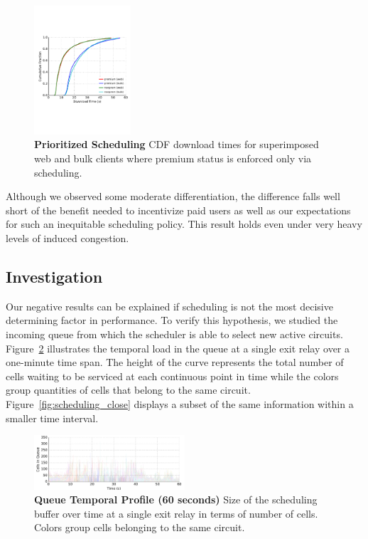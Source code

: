 \begin{figure} \centering
  \includegraphics[trim={0 3cm 0 3cm}, clip, width=0.32\textwidth]{images/scheduling_priority.pdf}
  \caption[Prioritized Scheduling]{\textbf{Prioritized Scheduling} CDF download
    times for superimposed web and bulk clients where premium status is enforced
    only via scheduling.}
  \label{fig:scheduling_priority}
\end{figure}

Although we observed some moderate differentiation, the difference falls well
short of the benefit needed to incentivize paid users as well as our
expectations for such an inequitable scheduling policy. This result holds even
under very heavy levels of induced congestion.

\subsection{Investigation}

Our negative results can be explained if scheduling is not the most decisive
determining factor in performance. To verify this hypothesis, we studied the
incoming queue from which the scheduler is able to select new active
circuits. Figure~\ref{fig:scheduling_far} illustrates the temporal load in the
queue at a single exit relay over a one-minute time span. The height of the
curve represents the total number of cells waiting to be serviced at each
continuous point in time while the colors group quantities of cells that belong
to the same circuit. Figure~\ref{fig:scheduling_close} displays a subset of the
same information within a smaller time interval.


\begin{figure} \centering
  \includegraphics[width=0.5\textwidth]{images/scheduling_far.png}
  \caption[Queue Temporal Profile (60 seconds)]{\textbf{Queue Temporal Profile
      (60 seconds)} Size of the scheduling buffer over time at a single exit
    relay in terms of number of cells. Colors group cells belonging to the same circuit.}
  \label{fig:scheduling_far}
\end{figure}

